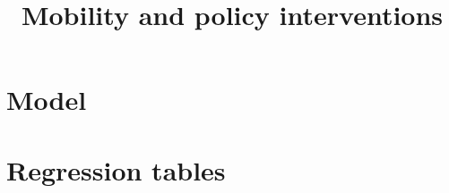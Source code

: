 \documentclass{article}
\title{Mobility and policy interventions}
\author{}
\date{}
\begin{document}
\section{Model}

\section{Regression tables}

\end{document}
